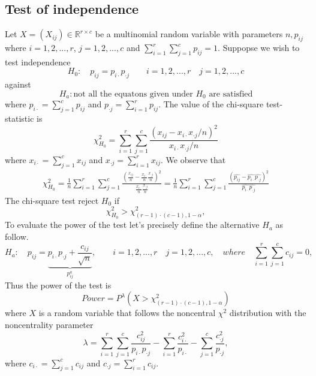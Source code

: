 \documentclass{article}
\begin{document}
\subsection{Test of independence}
Let $X=(X_{ij}) \in \mathbb{R}^{r \times c}$ be a multinomial random variable with
parameters $n,p_{ij}$ where $i=1,2,...,r$, $j=1,2,...,c$ and 
$\sum_{i=1}^r\sum_{j=1}^cp_{ij}=1$. 
Suppopse we wish to test independence
\begin{equation}
    H_0: \quad p_{ij}=p_{i \cdot}p_{\cdot j} \qquad i =1,2,...,r \quad j=1,2,...,c
\end{equation}
against
\begin{equation}
    H_a: \mbox{not all the equatons given under $H_0$ are satisfied}
\end{equation}
where $p_{i \cdot} = \sum_{j=1}^c p_{ij}$ and $p_{\cdot j} = \sum_{i=1}^r p_{ij}$.
The value of the chi-square test-statistic is
\begin{equation}
    \chi^2_{H_0} = \sum_{i=1}^r\sum_{j=1}^c \frac{\left(x_{ij} - x_{i \cdot}x_{\cdot j}/n\right)^2}{x_{i \cdot}x_{\cdot j}/n}
\end{equation}
where $x_{i \cdot} = \sum_{j=1}^c x_{ij}$ and $x_{\cdot j} = \sum_{i=1}^r x_{ij}$.
We observe that
\begin{align}
    \chi^2_{H_0} =\frac{1}{n} \sum_{i=1}^r\sum_{j=1}^c \frac{\left(\frac{x_{ij}}{n} - \frac{x_{i \cdot}}{n}\frac{x_{\cdot j}}{n}\right)^2}{\frac{x_{i \cdot}}{n}\frac{x_{\cdot j}}{n}}=  \frac{1}{n} \sum_{i=1}^r\sum_{j=1}^c \frac{\left(\widehat{p_{ij}} - \widehat{p_{i \cdot}}\widehat{p_{\cdot j}}\right)^2}{\widehat{p_{i \cdot}}\widehat{p_{\cdot j}}}
\end{align}
The chi-square test reject $H_0$ if
\begin{equation}
    \chi^2_{H_0} > \chi^2_{(r-1)\cdot(c-1),1-\alpha},
\end{equation}
To evaluate the power of the test let's precisely define the alternative $H_a$ as follow.
\begin{equation}
    H_a: \quad p_{ij} =\underbrace{p_{i\cdot}p_{\cdot j} + \frac{c_{ij}}{\sqrt{n}}}_{p^a_{ij}}, \qquad i =1,2,...,r \quad j=1,2,...,c, \quad where \quad \sum_{i=1}^{r}\sum_{j=1}^{c}c_{ij}=0, 
\end{equation}
Thus the power of the test is
\begin{equation}
    Power = P^{\lambda}\left(X > \chi^2_{(r-1)\cdot(c-1),1-\alpha}\right)
\end{equation}
where $X$ is a random variable that follows the noncentral $\chi^2$ distribution with the noncentrality parameter
\begin{equation}
    \lambda = \sum_{i=1}^{r}\sum_{j=1}^c \frac{c_{ij}^2}{p_{i\cdot}p_{\cdot j}} - \sum_{i=1}^{r}\frac{c_{i \cdot}^2}{p_{i \cdot}} - \sum_{j=1}^{c}\frac{c_{\cdot j}^2}{p_{\cdot j}},
\end{equation}
where $c_{i \cdot} = \sum_{j=1}^c c_{ij}$ and $c_{\cdot j} = \sum_{i=1}^r c_{ij}$.
\end{document}
